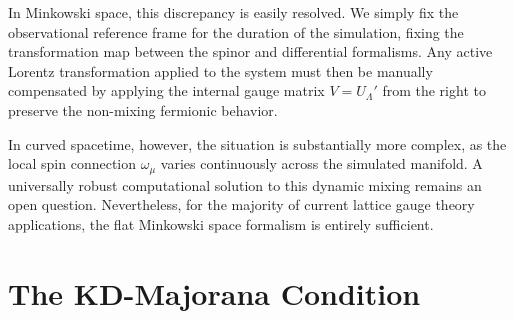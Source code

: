 In Minkowski space, this discrepancy is easily resolved. We simply fix the observational reference frame for the duration of the simulation, fixing the transformation map between the spinor and differential formalisms. Any active Lorentz transformation applied to the system must then be manually compensated by applying the internal gauge matrix $V=U_\Lambda'$ from the right to preserve the non-mixing fermionic behavior. 

In curved spacetime, however, the situation is substantially more complex, as the local spin connection $\omega_\mu$ varies continuously across the simulated manifold. A universally robust computational solution to this dynamic mixing remains an open question. Nevertheless, for the majority of current lattice gauge theory applications, the flat Minkowski space formalism is entirely sufficient.


\vspace{0.25cm}
\section{The KD-Majorana Condition}\label{sec:KD-Majorana}

